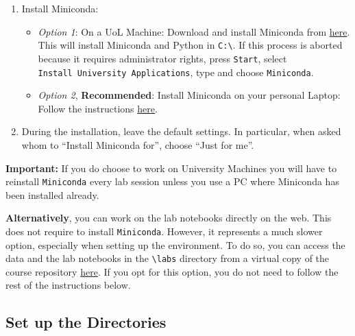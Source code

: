 \documentclass[
  letterpaper,
  DIV=11,
  numbers=noendperiod]{scrreprt}
\providecommand{\tightlist}{%
  \setlength{\itemsep}{0pt}\setlength{\parskip}{0pt}}\usepackage{longtable,booktabs,array}
\begin{document}
\begin{enumerate}
\def\labelenumi{\arabic{enumi}.}
\tightlist
\item
  Install Miniconda:

  \begin{itemize}
  \tightlist
  \item
    \emph{Option 1}: On a UoL Machine: Download and install Miniconda
    from
    \href{https://repo.anaconda.com/miniconda/Miniconda3-latest-Windows-x86_64.exe}{here}.
    This will install Miniconda and Python in
    \texttt{C:\textbackslash{}}. If this process is aborted because it
    requires administrator rights, press \texttt{Start}, select
    \texttt{Install\ University\ Applications}, type and choose
    \texttt{Miniconda}.
  \item
    \emph{Option 2}, \textbf{Recommended}: Install Miniconda on your
    personal Laptop: Follow the instructions
    \href{https://docs.conda.io/projects/miniconda/en/latest/miniconda-install.html}{here}.
  \end{itemize}
\item
  During the installation, leave the default settings. In particular,
  when asked whom to ``Install Miniconda for'', choose ``Just for me''.
\end{enumerate}

\textbf{Important:} If you do choose to work on University Machines you
will have to reinstall \texttt{Miniconda} every lab session unless you
use a PC where Miniconda has been installed already.

\textbf{Alternatively}, you can work on the lab notebooks directly on
the web. This does not require to install \texttt{Miniconda}. However,
it represents a much slower option, especially when setting up the
environment. To do so, you can access the data and the lab notebooks in
the \texttt{\textbackslash{}labs} directory from a virtual copy of the
course repository
\href{https://mybinder.org/v2/gh/GDSL-UL/wma/HEAD}{here}. If you opt for
this option, you do not need to follow the rest of the instructions
below.

\subsection*{Set up the Directories}\label{set-up-the-directories}
\end{document}
